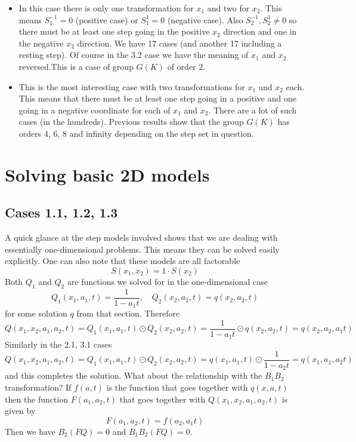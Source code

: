 \begin{itemize}
\item[Case 2.3:] In this case there is only one transformation for $x_1$ and two for $x_2$. This means $S_1^{-1} = 0$ (positive case) or $S_1^{1} = 0$ (negative case). Also $S_2^{-1}, S_2^1 \neq 0$ so there must be at least one step going in the positive $x_2$ direction and one in the negative $x_2$ direction. We have 17 cases (and another 17 including a resting step). Of course in the 3.2 case we have the meaning of $x_1$ and $x_2$ reversed.This is a case of group $G(K)$ of order 2.
\item[Case 3.3:] This is the most interesting case with two transformations for $x_1$ and $x_2$ each. This means that there must be at least one step going in a positive and one going in a negative coordinate for each of $x_1$ and $x_2$. There are a lot of such cases (in the hundreds). Previous results show that the group $G(K)$ has orders 4, 6, 8 and infinity depending on the step set in question.
 \end{itemize}
 
\section{Solving basic 2D models}

\subsection{Cases 1.1, 1.2, 1.3}
A quick glance at the step models involved shows that we are dealing with essentially one-dimensional problems. This means they can be solved easily explicitly. One can also note that these models are all factorable
\[
	S(x_1,x_2) = 1\cdot S(x_2)
\]
Both $Q_1$ and $Q_2$ are functions we solved for in the one-dimensional case
\[
	Q_1(x_1,a_1,t) = \frac{1}{1-a_1 t},\quad Q_2(x_2,a_2,t) = q(x_2,a_2,t)
\]
for some solution $q$ from that section. Therefore
\[
	Q(x_1,x_2,a_1,a_2,t) = Q_1(x_1,a_1,t) \odot Q_2(x_2,a_2,t) = \frac{1}{1-a_1 t}\odot q(x_2,a_2,t) = q(x_2,a_2,a_1 t)
\]
Similarly in the 2.1, 3.1 cases
\[
	Q(x_1,x_2,a_1,a_2,t) = Q_1(x_1,a_1,t) \odot Q_2(x_2,a_2,t) =  q(x_1,a_1,t) \odot \frac{1}{1-a_2 t}= q(x_1,a_1,a_2 t)
\]
and this completes the solution. What about the relationship with the $B_1B_2$ transformation? If $f(a,t)$ is the function that goes together with $q(x,a,t)$ then the function $F(a_1,a_2,t)$ that goes together with $Q(x_1,x_2,a_1,a_2,t)$ is given by
\[
	F(a_1,a_2,t) = f(a_2,a_1 t)
\]
Then we have $B_2 (FQ) = 0$ and $B_1B_2(FQ) = 0$.

